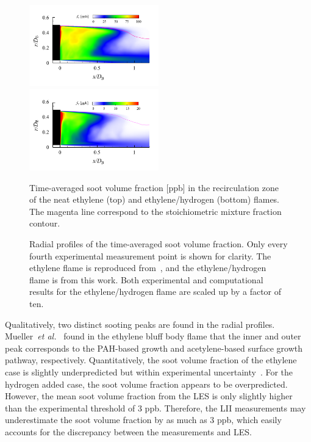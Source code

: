 \documentclass[review,3p,times]{elsarticle}
\begin{document}
\begin{figure}[t]
  \centering
  \scriptsize
  \vspace{-0.10in}
  \includegraphics[trim=0mm 1.0mm 0mm 0.5mm, clip=true, width=0.5\textwidth]{ethy_fv.png}
  \includegraphics[trim=0mm 1.0mm 0mm 0.5mm, clip=true, width=0.5\textwidth]{hy_fv.png}
  \normalsize
  \vspace{-0.2in}
  \caption{Time-averaged soot volume fraction [ppb] in the recirculation zone of the neat ethylene (top) and ethylene/hydrogen (bottom) flames.  The magenta line correspond to the stoichiometric mixture fraction contour.}
  \label{fig:fv_RZ}
\end{figure}

\begin{figure}[t]
  \centering
  \scriptsize
  \resizebox{0.49\textwidth}{!}{}
  \resizebox{0.49\textwidth}{!}{}
  \vspace{-0.2in}
  \normalsize
  \caption{Radial profiles of the time-averaged soot volume fraction.  Only every fourth experimental measurement point is shown for clarity.  The ethylene flame is reproduced from~\cite{mueller13}, and the ethylene/hydrogen flame is from this work.  Both experimental and computational results for the ethylene/hydrogen flame are scaled up by a factor of ten.}
  \label{fig:fv_radial}
\end{figure}

Qualitatively, two distinct sooting peaks are found in the radial profiles.  Mueller~\emph{et al.}~\cite{mueller13} found in the ethylene bluff body flame that the inner and outer peak corresponds to the PAH-based growth and acetylene-based surface growth pathway, respectively.  Quantitatively, the soot volume fraction of the ethylene case is slightly underpredicted but within experimental uncertainty~\cite{mueller13}.  For the hydrogen added case, the soot volume fraction appears to be overpredicted.  However, the mean soot volume fraction from the LES is only slightly higher than the experimental threshold of 3 ppb.  Therefore, the LII measurements may underestimate the soot volume fraction by as much as 3 ppb, which easily accounts for the discrepancy between the measurements and LES.  
\end{document}
